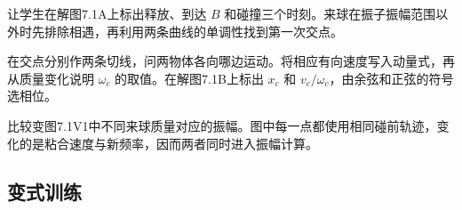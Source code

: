 \documentclass[UTF8,fontset=fandol,a4paper,11pt]{ctexart}
\begin{document}
让学生在解图7.1A上标出释放、到达 $B$ 和碰撞三个时刻。来球在振子振幅范围以外时先排除相遇，再利用两条曲线的单调性找到第一次交点。

在交点分别作两条切线，问两物体各向哪边运动。将相应有向速度写入动量式，再从质量变化说明 $\omega_c$ 的取值。在解图7.1B上标出 $x_c$ 和 $v_c/\omega_c$，由余弦和正弦的符号选相位。

比较变图7.1V1中不同来球质量对应的振幅。图中每一点都使用相同碰前轨迹，变化的是粘合速度与新频率，因而两者同时进入振幅计算。




\subsection*{变式训练}
\end{document}
